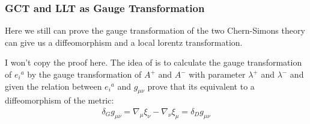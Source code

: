 \subsubsection{GCT and LLT as Gauge Transformation}

Here we still can prove the gauge transformation of the two
Chern-Simons theory can give us a diffeomorphism and a local lorentz
transformation.

I won't copy the proof here. The idea of
\cite{compereAdvancedLecturesGeneral2019a} is to calculate the gauge
transformation of  $ e_i{}^a $ by the gauge transformation of $ A^+ $
and $ A^- $ with parameter $ \lambda^+ $ and $ \lambda^- $ and given
the relation between $ e_{i}{}^a $ and $ g_{\mu \nu} $ prove that its
equivalent to a diffeomorphism of the metric:
\begin{align}
  \delta_G g_{\mu \nu} = \nabla_\mu \xi_\nu - \nabla_\nu \xi_\mu =
  \delta_D g_{\mu \nu}
\end{align}
